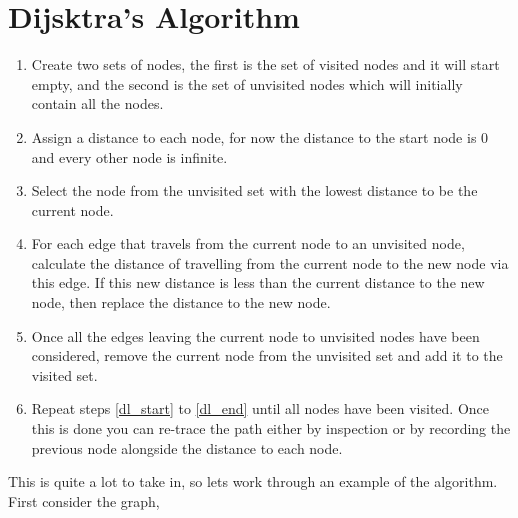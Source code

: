 \documentclass[a4paper,12pt]{article}
\begin{document}
\large
\section*{Dijsktra's Algorithm}

\begin{enumerate}
\item Create two sets of nodes, the first is the set of visited nodes 
and it will start empty, and the second is the set of unvisited nodes 
which will initially contain all the nodes.
\item Assign a distance to each node, for now the distance to the 
start node is 0 and every other node is infinite.
\item Select the node from the unvisited set with the lowest distance 
to be the current node. \label{dl_start}
\item For each edge that travels from the current node to an unvisited 
node, calculate the distance of travelling from the current node 
to the new node via this edge. If this new distance is less than 
the current distance to the new node, then replace the distance to 
the new node. 
\item Once all the edges leaving the current node to unvisited nodes 
have been considered, remove the current node from the unvisited set 
and add it to the visited set. \label{dl_end}
\item Repeat steps \ref{dl_start} to \ref{dl_end} until all nodes have 
been visited. Once this is done you can re-trace the path either by 
inspection or by recording the previous node alongside the distance to 
each node.
\end{enumerate}

This is quite a lot to take in, so lets work through an example of the 
algorithm. First consider the graph,

\end{document}
